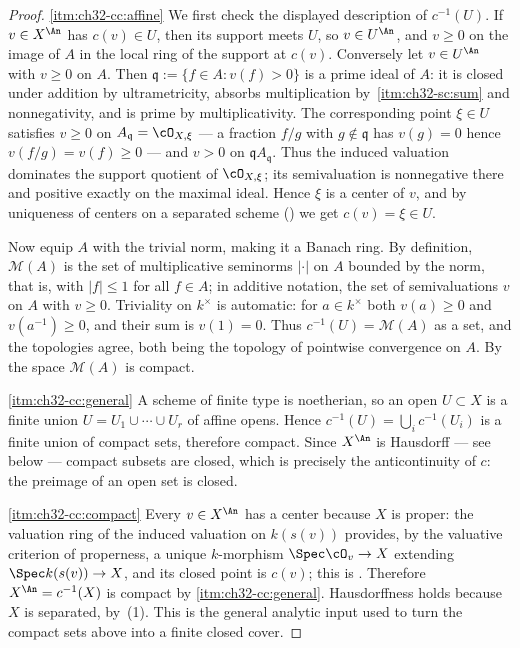 \begin{proof}
\cref{itm:ch32-cc:affine}  We first check the displayed description of
$c^{-1}(U)$.  If $v\in X^{\An}$ has $c(v)\in U$, then its support meets
$U$, so $v\in U^{\An}$, and $v\geq0$ on
the image of $A$ in the local ring of the support at $c(v)$.  Conversely let $v\in U^{\An}$ with $v\geq0$
on $A$.  Then $\mathfrak q:=\{f\in A:v(f)>0\}$ is a prime ideal of $A$:
it is closed under addition by ultrametricity, absorbs multiplication by
\,\cref{itm:ch32-sc:sum} and
nonnegativity, and is prime by multiplicativity.  The corresponding point
$\xi\in U$ satisfies $v\geq0$ on $A_{\mathfrak q}=\cO_{X,\xi}$ --- a
fraction $f/g$ with $g\notin\mathfrak q$ has $v(g)=0$ hence
$v(f/g)=v(f)\geq0$ --- and $v>0$ on $\mathfrak q A_{\mathfrak q}$.
Thus the induced valuation dominates the support quotient of
$\cO_{X,\xi}$; its semivaluation is nonnegative there and positive exactly
on the maximal ideal.  Hence $\xi$ is a center of $v$, and by
uniqueness of centers on a separated scheme
() we get $c(v)=\xi\in U$.

Now equip $A$ with the trivial norm, making it a Banach ring.  By
definition, $\mathcal M(A)$ is the set of multiplicative seminorms
$|\cdot|$ on $A$ bounded by the norm, that is, with $|f|\leq1$ for all
$f\in A$; in additive notation, the set of semivaluations $v$ on $A$
with $v\geq0$.  Triviality on $k^\times$ is automatic: for
$a\in k^\times$ both $v(a)\geq0$ and $v(a^{-1})\geq0$, and their sum is
$v(1)=0$.  Thus $c^{-1}(U)=\mathcal M(A)$ as a set, and the topologies
agree, both being the topology of pointwise convergence on $A$.  By
 the space $\mathcal M(A)$ is compact.

\cref{itm:ch32-cc:general}  A scheme of finite type is noetherian, so an open
$U\subset X$ is a finite union $U=U_1\cup\cdots\cup U_r$ of affine opens.
Hence $c^{-1}(U)=\bigcup_ic^{-1}(U_i)$ is a finite union of compact sets,
therefore compact.  Since $X^{\An}$ is Hausdorff --- see below --- compact
subsets are closed, which is precisely the anticontinuity of $c$: the
preimage of an open set is closed.

\cref{itm:ch32-cc:compact}  Every $v\in X^{\An}$ has a center because $X$
is proper: the valuation ring of the induced valuation on $k(s(v))$
provides, by the valuative criterion of properness, a unique
$k$-morphism $\Spec\cO_v\to X$ extending $\Spec k(s(v))\to X$, and its
closed point is $c(v)$; this is .
Therefore $X^{\An}=c^{-1}(X)$ is compact by \cref{itm:ch32-cc:general}.
Hausdorffness holds because $X$ is separated, by
\,(1).  This is the general analytic input
used to turn the compact sets above into a finite closed cover.
\end{proof}

